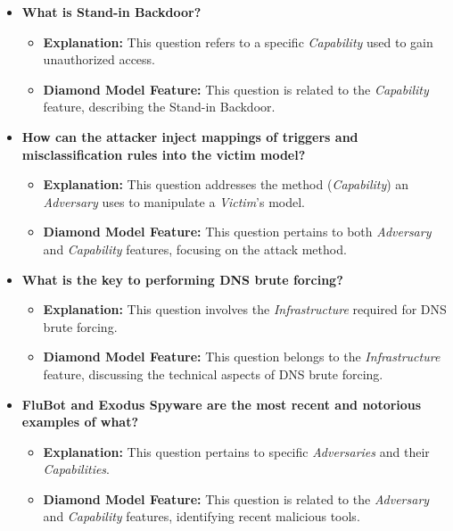 \documentclass{article}
\begin{document}
\begin{itemize}
    \item \textbf{What is Stand-in Backdoor?}
    \begin{itemize}
        \item \textbf{Explanation:} This question refers to a specific \textit{Capability} used to gain unauthorized access.
        \item \textbf{Diamond Model Feature:} This question is related to the \textit{Capability} feature, describing the Stand-in Backdoor.
    \end{itemize}

    \item \textbf{How can the attacker inject mappings of triggers and misclassification rules into the victim model?}
    \begin{itemize}
        \item \textbf{Explanation:} This question addresses the method (\textit{Capability}) an \textit{Adversary} uses to manipulate a \textit{Victim}'s model.
        \item \textbf{Diamond Model Feature:} This question pertains to both \textit{Adversary} and \textit{Capability} features, focusing on the attack method.
    \end{itemize}

    \item \textbf{What is the key to performing DNS brute forcing?}
    \begin{itemize}
        \item \textbf{Explanation:} This question involves the \textit{Infrastructure} required for DNS brute forcing.
        \item \textbf{Diamond Model Feature:} This question belongs to the \textit{Infrastructure} feature, discussing the technical aspects of DNS brute forcing.
    \end{itemize}

    \item \textbf{FluBot and Exodus Spyware are the most recent and notorious examples of what?}
    \begin{itemize}
        \item \textbf{Explanation:} This question pertains to specific \textit{Adversaries} and their \textit{Capabilities}.
        \item \textbf{Diamond Model Feature:} This question is related to the \textit{Adversary} and \textit{Capability} features, identifying recent malicious tools.
    \end{itemize}


\end{itemize}
\end{document}
